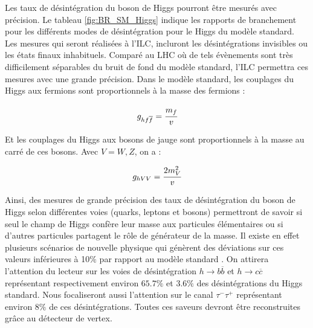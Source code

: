    Les taux de d\'esint\'egration du boson de Higgs pourront \^etre mesur\'es avec pr\'ecision. Le tableau \ref{fig:BR_SM_Higgs} indique les rapports de branchement pour les diff\'erents modes de d\'esint\'egration pour le Higgs du mod\`ele standard. Les mesures qui seront r\'ealis\'ees \`a l'ILC, incluront  les d\'esint\'egrations invisibles ou les \'etats finaux inhabituels. Compar\'e au LHC o\`u de tels \'ev\`enements sont tr\`es difficilement s\'eparables du bruit de fond du mod\`ele standard, l'ILC permettra ces mesures avec une grande pr\'ecision. Dans le mod\`ele standard, les couplages du Higgs aux fermions sont proportionnels \`a la masse des fermions :
   
   \begin{equation}
    g_{hf\overline{f}} = \cfrac{m_f}{v}
   \end{equation}
  
    Et les couplages du Higgs aux bosons de jauge sont proportionnels \`a la masse au carr\'e de ces bosons. Avec $V = W , Z$, on a : 
    
    \begin{equation}
     g_{hVV} = \cfrac{2 m_V^2}{v}
    \end{equation}

 
   Ainsi, des mesures de grande pr\'ecision des taux de d\'esint\'egration du boson de Higgs selon diff\'erentes voies (quarks, leptons et bosons) permettront de savoir si seul le champ de Higgs conf\`ere leur masse aux particules \'el\'ementaires ou si d'autres particules partagent le rôle de g\'en\'erateur de la masse. Il existe en effet plusieurs sc\'enarios de nouvelle physique qui g\'en\`erent des d\'eviations sur ces valeurs inf\'erieures \`a 10$\%$ par rapport au mod\`ele standard \cite{Gupta:2013}. On attirera l'attention du lecteur sur les voies de d\'esint\'egration $h \rightarrow b\overline{b}$ et $h \rightarrow c\overline{c}$ repr\'esentant respectivement environ $65.7\%$ et $3.6\%$ des d\'esint\'egrations du Higgs standard. Nous focaliseront aussi l'attention sur le canal $\tau^- \tau^+$ repr\'esentant environ $8\%$ de ces d\'esint\'egrations. Toutes ces saveurs devront \^etre reconstruites gr\^ace au d\'etecteur de vertex. 
   
